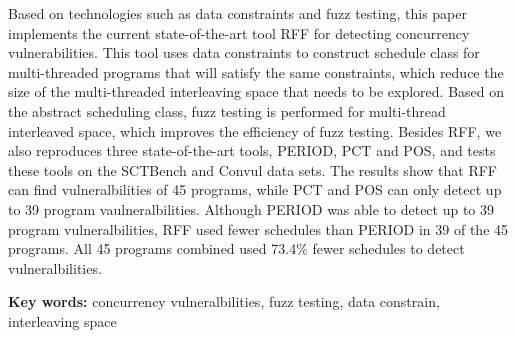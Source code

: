 
Based on technologies such as data constraints and fuzz testing, this paper implements the current state-of-the-art tool RFF for detecting concurrency vulnerabilities. This tool uses data constraints to construct schedule class for multi-threaded programs that will satisfy the same constraints, which reduce the size of the multi-threaded interleaving space that needs to be explored.
Based on the abstract scheduling class, fuzz testing is performed for multi-thread interleaved space, which improves the efficiency of fuzz testing. Besides RFF, we also reproduces three state-of-the-art tools, PERIOD, PCT and POS, and tests these tools on the SCTBench and Convul data sets. The results show that RFF can find vulneralbilities of 45 programs, while PCT and POS can only detect up to 39 program vaulneralbilities. Although PERIOD was able to detect up to 39 program vulneralbilities, RFF used fewer schedules than PERIOD in 39 of the 45 programs. All 45 programs combined used 73.4\% fewer schedules to detect vulneralbilities.

\textbf{Key words: } concurrency vulneralbilities, fuzz testing, data constrain, interleaving space